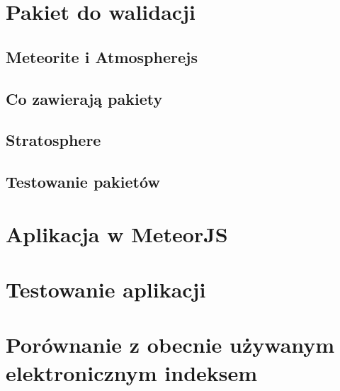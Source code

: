 \documentclass[brudnopis]{xmgr}
\begin{document}
      
\chapter{Pakiet do walidacji}

\section{Meteorite i Atmospherejs}
    
\section{Co zawierają pakiety}

\section{Stratosphere}
   
\section{Testowanie pakietów}

\chapter{Aplikacja w MeteorJS}

\chapter{Testowanie aplikacji}

\chapter{Porównanie z obecnie używanym elektronicznym indeksem}

\summary





\cite {Atmosphere}
\cite {Meteor}
\cite{Node}
\cite{Mongo}
\cite{Mesosphere}
\cite{DiscoverMeteor}
\cite{ScalingMongoDB}
\cite{ScalingWithMongoDB}
\cite{TDDwM}






\oswiadczenie
\end{document}
